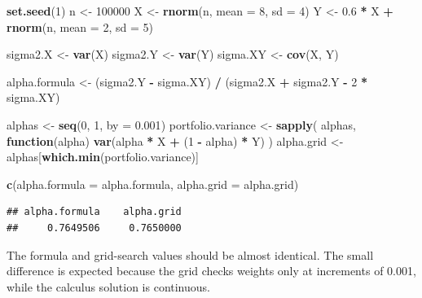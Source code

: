 \documentclass[
  11pt,
]{article}
\newenvironment{Shaded}{\begin{snugshade}}{\end{snugshade}}
\newcommand{\AttributeTok}[1]{\textcolor[rgb]{0.13,0.29,0.53}{#1}}
\newcommand{\ControlFlowTok}[1]{\textcolor[rgb]{0.13,0.29,0.53}{\textbf{#1}}}
\newcommand{\DecValTok}[1]{\textcolor[rgb]{0.00,0.00,0.81}{#1}}
\newcommand{\FloatTok}[1]{\textcolor[rgb]{0.00,0.00,0.81}{#1}}
\newcommand{\FunctionTok}[1]{\textcolor[rgb]{0.13,0.29,0.53}{\textbf{#1}}}
\newcommand{\NormalTok}[1]{#1}
\newcommand{\OtherTok}[1]{\textcolor[rgb]{0.56,0.35,0.01}{#1}}
\newcommand{\SpecialCharTok}[1]{\textcolor[rgb]{0.81,0.36,0.00}{\textbf{#1}}}
\begin{document}
\begin{Shaded}
\begin{Highlighting}[]
\FunctionTok{set.seed}\NormalTok{(}\DecValTok{1}\NormalTok{)}
\NormalTok{n }\OtherTok{\textless{}{-}} \DecValTok{100000}
\NormalTok{X }\OtherTok{\textless{}{-}} \FunctionTok{rnorm}\NormalTok{(n, }\AttributeTok{mean =} \DecValTok{8}\NormalTok{, }\AttributeTok{sd =} \DecValTok{4}\NormalTok{)}
\NormalTok{Y }\OtherTok{\textless{}{-}} \FloatTok{0.6} \SpecialCharTok{*}\NormalTok{ X }\SpecialCharTok{+} \FunctionTok{rnorm}\NormalTok{(n, }\AttributeTok{mean =} \DecValTok{2}\NormalTok{, }\AttributeTok{sd =} \DecValTok{5}\NormalTok{)}

\NormalTok{sigma2.X }\OtherTok{\textless{}{-}} \FunctionTok{var}\NormalTok{(X)}
\NormalTok{sigma2.Y }\OtherTok{\textless{}{-}} \FunctionTok{var}\NormalTok{(Y)}
\NormalTok{sigma.XY }\OtherTok{\textless{}{-}} \FunctionTok{cov}\NormalTok{(X, Y)}

\NormalTok{alpha.formula }\OtherTok{\textless{}{-}}\NormalTok{ (sigma2.Y }\SpecialCharTok{{-}}\NormalTok{ sigma.XY) }\SpecialCharTok{/}
\NormalTok{  (sigma2.X }\SpecialCharTok{+}\NormalTok{ sigma2.Y }\SpecialCharTok{{-}} \DecValTok{2} \SpecialCharTok{*}\NormalTok{ sigma.XY)}

\NormalTok{alphas }\OtherTok{\textless{}{-}} \FunctionTok{seq}\NormalTok{(}\DecValTok{0}\NormalTok{, }\DecValTok{1}\NormalTok{, }\AttributeTok{by =} \FloatTok{0.001}\NormalTok{)}
\NormalTok{portfolio.variance }\OtherTok{\textless{}{-}} \FunctionTok{sapply}\NormalTok{(}
\NormalTok{  alphas,}
  \ControlFlowTok{function}\NormalTok{(alpha) }\FunctionTok{var}\NormalTok{(alpha }\SpecialCharTok{*}\NormalTok{ X }\SpecialCharTok{+}\NormalTok{ (}\DecValTok{1} \SpecialCharTok{{-}}\NormalTok{ alpha) }\SpecialCharTok{*}\NormalTok{ Y)}
\NormalTok{)}
\NormalTok{alpha.grid }\OtherTok{\textless{}{-}}\NormalTok{ alphas[}\FunctionTok{which.min}\NormalTok{(portfolio.variance)]}

\FunctionTok{c}\NormalTok{(}\AttributeTok{alpha.formula =}\NormalTok{ alpha.formula, }\AttributeTok{alpha.grid =}\NormalTok{ alpha.grid)}
\end{Highlighting}
\end{Shaded}

\begin{verbatim}
## alpha.formula    alpha.grid 
##     0.7649506     0.7650000
\end{verbatim}

The formula and grid-search values should be almost identical. The small
difference is expected because the grid checks weights only at
increments of 0.001, while the calculus solution is continuous.
\end{document}
